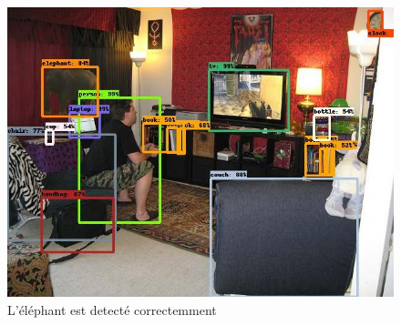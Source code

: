 \documentclass[12pt, letterpaper]{article}
\begin{document}
\begin{figure}[H]
    \includegraphics[width=\linewidth]{img/fig15.jpg}
    \caption{L'éléphant est detecté correctemment}
    \label{fig:L14}
\end{figure}
\end{document}

